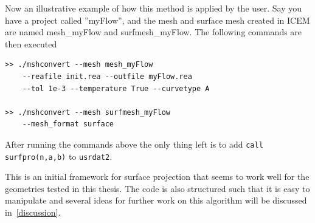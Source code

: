 Now an illustrative example of how this method is applied by the user. Say you have a project
called ''myFlow'', and the mesh and surface mesh created in ICEM are named mesh\_myFlow and 
surfmesh\_myFlow. The following commands are then executed

%

% 
\begingroup
\fontsize{12pt}{14pt}
\begin{lstlisting}[escapechar=|,frame=none]
>> ./mshconvert --mesh mesh_myFlow 
    --reafile init.rea --outfile myFlow.rea
    --tol 1e-3 --temperature True --curvetype A

>> ./mshconvert --mesh surfmesh_myFlow 
    --mesh_format surface

\end{lstlisting}
\endgroup
After running the commands above the only thing left is to 
add \verb|call surfpro(n,a,b)| to \verb|usrdat2|.

This is an initial framework for surface projection that seems to work well for the geometries tested in this thesis.
The code is also structured such that it is easy to manipulate and several ideas for 
further work on this algorithm will be discussed in~\cref{discussion}.

% 
% 
\newpage
